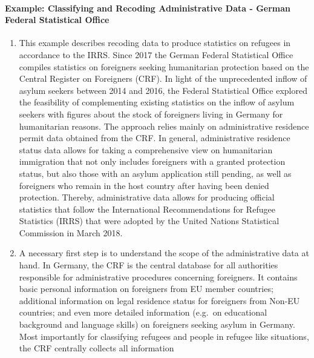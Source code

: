 \documentclass[
]{article}
\begin{document}
\hypertarget{example-classifying-and-recoding-administrative-data---german-federal-statistical-office}{%
\paragraph{Example: Classifying and Recoding Administrative Data - German Federal Statistical Office}\label{example-classifying-and-recoding-administrative-data---german-federal-statistical-office}}

\begin{enumerate}
\def\labelenumi{\arabic{enumi}.}
\setcounter{enumi}{372}
\item
  This example describes recoding data to produce statistics on
  refugees in accordance to the IRRS. Since 2017 the German Federal
  Statistical Office compiles statistics on foreigners seeking
  humanitarian protection based on the Central Register on Foreigners
  (CRF). In light of the unprecedented inflow of asylum seekers
  between 2014 and 2016, the Federal Statistical Office explored the
  feasibility of complementing existing statistics on the inflow of
  asylum seekers with figures about the stock of foreigners living in
  Germany for humanitarian reasons. The approach relies mainly on
  administrative residence permit data obtained from the CRF. In
  general, administrative residence status data allows for taking a
  comprehensive view on humanitarian immigration that not only
  includes foreigners with a granted protection status, but also those
  with an asylum application still pending, as well as foreigners who
  remain in the host country after having been denied protection.
  Thereby, administrative data allows for producing official
  statistics that follow the International Recommendations for Refugee
  Statistics (IRRS) that were adopted by the United Nations
  Statistical Commission in March 2018.
\item
  A necessary first step is to understand the scope of the
  administrative data at hand. In Germany, the CRF is the central
  database for all authorities responsible for administrative
  procedures concerning foreigners. It contains basic personal
  information on foreigners from EU member countries; additional
  information on legal residence status for foreigners from Non-EU
  countries; and even more detailed information (e.g.~on educational
  background and language skills) on foreigners seeking asylum in
  Germany. Most importantly for classifying refugees and people in
  refugee like situations, the CRF centrally collects all information

\end{enumerate}
\end{document}
